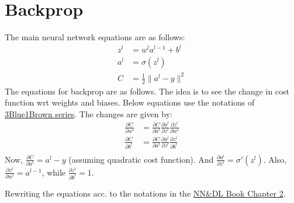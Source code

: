 \documentclass[11pt]{article}
\begin{document}
\section{Backprop}
The main neural network equations are as follows:
\begin{equation}
\begin{split}
z^l & = w^la^{l-1} + b^l \\
a^l & = \sigma(z^l) \\
C & = \frac{1}{2} \| a^l - y \|^{2}
\end{split}
\end{equation}
The equations for backprop are as follows. The idea is to see the change in cost function wrt weights and biases.
Below equations use the notations of \href{https://youtube.com/playlist?list=PLZHQObOWTQDNU6R1_67000Dx_ZCJB-3pi}{3Blue1Brown series}. 
The changes are given by:
\begin{equation}
\begin{split}
\frac{\partial C}{\partial w^{l}} & = \frac{\partial C}{\partial a^{l}}\frac{\partial a^{l}}{\partial z^{l}}\frac{\partial z^{l}}{\partial w^{l}} \\
\frac{\partial C}{\partial b^{l}} & = \frac{\partial C}{\partial a^{l}}\frac{\partial a^{l}}{\partial z^{l}}\frac{\partial z^{l}}{\partial b^{l}} \\
\end{split}
\end{equation}
Now, $ \frac{\partial C}{\partial a^{l}} = a^{l} - y $ (assuming quadratic cost function). 
And $ \frac{\partial a^{l}}{\partial z^{l}} = \sigma'(z^{l}) $.
Also, $ \frac{\partial z^{l}}{\partial w^{l}} = a^{l-1} $, while $ \frac{\partial z^{l}}{\partial b^{l}} = 1 $.     

Rewriting the equations acc. to the notations in 
the \href{http://neuralnetworksanddeeplearning.com/chap2.html}{NN\&DL Book Chapter 2}.
\end{document}
